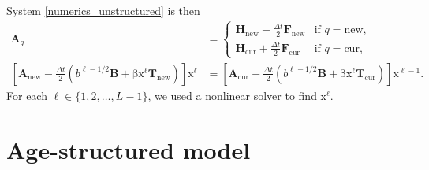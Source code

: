 \documentclass[USenglish]{article}
\renewcommand{\vec}[1]{\boldsymbol{\mathrm{#1}}}
\newcommand{\mat}[1]{\mathbf{#1}}
\begin{document}
System \eqref{numerics_unstructured} is then
\begin{subequations}
  \label{step_unstructured}
  \begin{align}
    \mat{A}_q &=
    \begin{cases}
      \mat{H}_{\mathrm{new}} - \frac{\Delta t}{2} \mat{F}_{\mathrm{new}}
      & \text{if $q = \mathrm{new}$},
      \\
      \mat{H}_{\mathrm{cur}} + \frac{\Delta t}{2} \mat{F}_{\mathrm{cur}}
      & \text{if $q = \mathrm{cur}$},
    \end{cases}
    \\
    \left[
      \mat{A}_{\mathrm{new}}
      - \frac{\Delta t}{2} \left(
        b^{\ell - 1 / 2} \mat{B}
        + \vec{\beta} \vec{x}^{\ell} \mat{T}_{\mathrm{new}}
      \right)
    \right]
    \vec{x}^{\ell} &=
    \left[
      \mat{A}_{\mathrm{cur}}
      + \frac{\Delta t}{2} \left(
        b^{\ell - 1 / 2} \mat{B}
        + \vec{\beta} \vec{x}^{\ell} \mat{T}_{\mathrm{cur}}
      \right)
    \right]
    \vec{x}^{\ell - 1}.
  \end{align}
\end{subequations}
For each $\ell \in \{1, 2, \ldots, L - 1\}$, we used a nonlinear
solver to find $\vec{x}^{\ell}$.


\section{Age-structured model}
\end{document}
